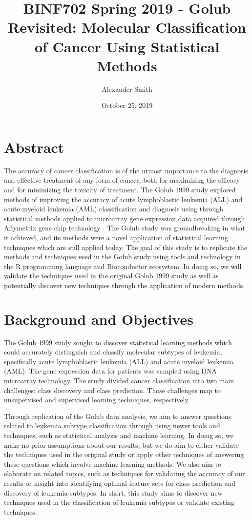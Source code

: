 \documentclass{article}
\title{BINF702 Spring 2019 - Golub Revisited: Molecular Classification
  of Cancer Using Statistical Methods}
\author{Alexander Smith}
\date{October 25, 2019}
\begin{document}
\maketitle

\section{Abstract}

The accuracy of cancer classification is of the utmost importance to the
diagnosis and effective treatment of any form of cancer, both for
maximizing the efficacy and for minimizing the toxicity of treatment.
The Golub 1999 study explored methods of improving the accuracy of acute
lymphoblastic leukemia (ALL) and acute myeloid leukemia (AML)
classification and diagnosis using through statistical methods applied
to microarray gene expression data acquired through Affymetrix gene chip
technology \autocite{GOLUB}. The Golub study was groundbreaking in what it
achieved, and its methods were a novel application of statistical
learning techniques which are still applied today. The goal of this
study is to replicate the methods and techniques used in the Golub study
using tools and technology in the R programming language and
Bioconductor ecosystem. In doing so, we will validate the techniques
used in the original Golub 1999 study as well as potentially discover
new techniques through the application of modern methods.

\section{Background and Objectives}

The Golub 1999 study sought to discover statistical learning methods
which could accurately distinguish and classify molecular subtypes of
leukemia, specifically acute lymphoblastic leukemia (ALL) and acute
myeloid leukemia (AML). The gene expression data for patients was
sampled using DNA microarray technology. The study divided cancer
classification into two main challenges: class discovery and class
prediction. Those challenges map to unsupervised and supervised
learning techniques, respectively.

Through replication of the Golub data analysis, we aim to answer
questions related to leukemia subtype classification through using newer
tools and techniques, such as statistical analysis and machine learning.
In doing so, we make no prior assumptions about our results, but we do
aim to either validate the techniques used in the original study or
apply other techniques of answering these questions which involve
machine learning methods. We also aim to elaborate on related topics,
such as techniques for validating the accuracy of our results or insight
into identifying optimal feature sets for class prediction and discovery
of leukemia subtypes. In short, this study aims to discover new
techniques used in the classification of leukemia subtypes or validate
existing techniques.
\end{document}
